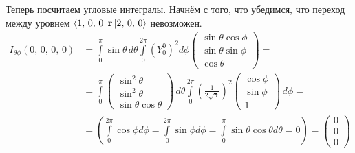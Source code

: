 Теперь посчитаем угловые интегралы. Начнём с того, что убедимся, что переход между уровнем $\bra{1,\,0,\,0}\mathbf{r}\ket{2,\,0,\,0}$ невозможен.
\begin{align*}
    I_{\theta\phi}(0,\,0,\,0,\,0) &= \int\limits_{0}^{\pi}\sin\theta\,d\theta\int\limits_{0}^{2\pi}(Y^0_0)^2d\phi \begin{pmatrix} \sin\theta\cos\phi \\ \sin\theta\sin\phi \\ \cos\theta \end{pmatrix} = \\& = \int\limits_{0}^{\pi} \begin{pmatrix} \sin^2 \theta \\ \sin^2 \theta \\ \sin\theta\cos\theta \end{pmatrix} \, d\theta \int\limits_{0}^{2\pi} \left(\frac{1}{2\sqrt{\pi}}\right)^2 \begin{pmatrix} \cos\phi \\ \sin\phi \\ 1 \end{pmatrix} \, d\phi = \\& = \left( \int\limits_{0}^{2\pi} \cos\phi d\phi = \int\limits_{0}^{2\pi} \sin\phi d\phi = \int\limits_{0}^{\pi} \sin\theta \cos\theta d\theta = 0 \right) = \begin{pmatrix} 0 \\ 0 \\ 0
    \end{pmatrix}
\end{align*}

